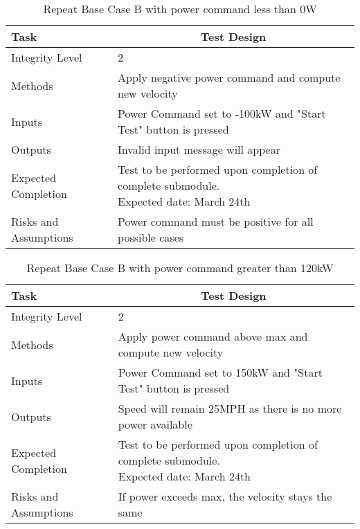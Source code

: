 \documentclass[]{article}
\begin{document}
	\begin{table}[H]
		\centering
		\caption{Repeat Base Case B with power command less than 0W }
		\begin{tabular}{|l|l|}
			\hline
			Task & \multicolumn{1}{c|}{Test Design} \\ \hline
			Integrity Level & 2 \\ \hline
			Methods & Apply negative power command and compute new velocity  \\ \hline
			Inputs &  Power Command set to -100kW and "Start Test" button is pressed \\ \hline
			Outputs &  Invalid input message will appear  \\ \hline
			Expected Completion & \parbox[t]{10cm}{Test to be performed upon completion of complete submodule.\\ Expected date: March 24th}\\ \hline
			Risks and Assumptions & Power command must be positive for all possible cases\\ \hline
		\end{tabular}
	\end{table}

	\begin{table}[H]
		\centering
		\caption{Repeat Base Case B with power command greater than 120kW }
		\begin{tabular}{|l|l|}
			\hline
			Task & \multicolumn{1}{c|}{Test Design} \\ \hline
			Integrity Level & 2 \\ \hline
			Methods & Apply power command above max and compute new velocity  \\ \hline
			Inputs &  Power Command set to 150kW and "Start Test" button is pressed \\ \hline
			Outputs &  Speed will remain 25MPH as there is no more power available  \\ \hline
			Expected Completion & \parbox[t]{10cm}{Test to be performed upon completion of complete submodule.\\ Expected date: March 24th}\\ \hline
			Risks and Assumptions & If power exceeds max, the velocity stays the same\\ \hline
		\end{tabular}
	\end{table}
\end{document}
